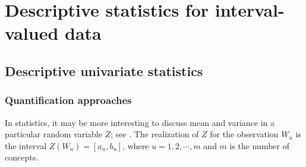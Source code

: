 \documentclass[article]{jss}
\begin{document}
\begin{table}[t!]
\caption{\label{tab:classic2sym} Summaries of the built-in interval-valued data.}
\end{table}%


\section{Descriptive statistics for interval-valued data}

\subsection{Descriptive univariate statistics}

\subsubsection{Quantification approaches}
In statistics, it may be more interesting to discuss mean and variance
in a particular random variable $Z$; see \cite{bertrand:2000}. The
realization of $Z$ for the observation $W_u$ is the interval $Z(W_u) =
[a_u,b_u]$, where $u=1,2,\cdots,m$ and $m$ is the number of concepts.
\end{document}
